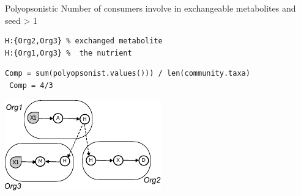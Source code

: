 \documentclass[8pt,usenames,dvipsnames]{beamer}
\begin{document}
\begin{frame}[fragile]
\begin{onlyenv}
\begin{minipage}{0.5\textwidth}

\begin{exampleblock}{Polyopsonistic}
Number of consumers involve in exchangeable metabolites and seed > 1
\end{exampleblock}{}

\begin{lstlisting}[mathescape=True]
H:{Org2,Org3} % exchanged metabolite
H:{Org1,Org3} %  the nutrient
\end{lstlisting}

\begin{lstlisting}[mathescape=True]
 Comp = sum(polyopsonist.values())) / len(community.taxa)
 Comp = 4/3 
\end{lstlisting}

%

\end{minipage}%
\hspace{0.5cm}
\hfill
\begin{minipage}{0.4\textwidth}
\includegraphics[width=\textwidth]{figures/exchanged.pdf}
\end{minipage}
\end{onlyenv}


\end{frame}
\end{document}
